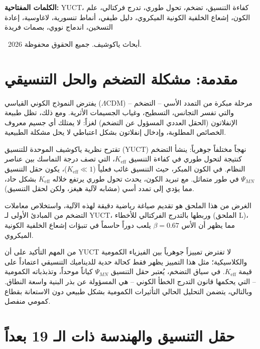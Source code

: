 \documentclass[11pt,a4paper]{article}
\theoremstyle{remark}
\newcommand{\Keff}{K_{\mathrm{eff}}}
\begin{document}
\begin{titlepage}
		\vspace{0.5cm}
		
		\noindent
		{\small\textbf{الكلمات المفتاحية:}} YUCT، كفاءة التنسيق، تضخم، تحول طوري، تدرج فركتالي، علم الكون، إشعاع الخلفية الكونية الميكروي، دليل طيفي، أنماط تنسورية، لاغاوسية، إعادة التسخين، اندماج نووي، بصمات فريدة
		
		\vspace{0.5cm}
		
		\noindent
		\textcopyright\ 2026 أبحاث ياكوشيف. جميع الحقوق محفوظة.
	\end{titlepage}
	
	\tableofcontents
	\newpage
	
	\section{مقدمة: مشكلة التضخم والحل التنسيقي}
	\label{sec:intro}
	
	يفترض النموذج الكوني القياسي ($\Lambda$CDM) مرحلة مبكرة من التمدد الأسي – التضخم – والتي تفسر التجانس، التسطيح، وغياب الجسيمات الأثرية. ومع ذلك، تظل طبيعة الإنفلاتون (الحقل العددي المسؤول عن التضخم) لغزاً: لا يمتلك أي جسيم معروف الخصائص المطلوبة، وإدخال إنفلاتون بشكل اعتباطي لا يحل مشكلة الطبيعية.
	
	تقترح نظرية ياكوشيف الموحدة للتنسيق (YUCT) نهجاً مختلفاً جوهرياً: ينشأ التضخم كنتيجة لتحول طوري في كفاءة التنسيق $\Keff$، التي تصف درجة التماسك بين عناصر النظام. في الكون المبكر، حيث التنسيق غائب فعلياً ($\Keff \ll 1$)، يكون حقل التنسيق $\Psi_{MN}$ في طور متماثل. مع تبريد الكون، يحدث تحول طوري يرتفع خلاله $\Keff$ بشكل حاد، مما يؤدي إلى تمدد أسي (مشابه لآلية هيغز، ولكن لحقل التنسيق).
	
	الغرض من هذا الملحق هو تقديم صياغة رياضية دقيقة لهذه الآلية، واستخلاص معاملات التضخم من المبادئ الأولى لـ YUCT، وربطها بالتدرج الفركتالي للأخطاء (الملحق L)، مما يظهر أن الأس $\beta = 0.67$ يلعب دوراً حاسماً في تنبؤات إشعاع الخلفية الكونية الميكروي.
	
	من المهم التأكيد على أن YUCT لا تفترض تمييزاً جوهرياً بين الفيزياء الكمومية والكلاسيكية؛ مثل هذا التمييز يظهر فقط كحالة حدية للديناميك التنسيقي اعتماداً على قيمة $K_{\mathrm{eff}}$. في سياق التضخم، يُعتبر حقل التنسيق $\Psi_{MN}$ كياناً موحداً، وتذبذباته الكمومية – التي يحكمها قانون التدرج الخطأ الكوني – هي المسؤولة عن بذر البنية واسعة النطاق. وبالتالي، يتضمن التحليل الحالي التأثيرات الكمومية بشكل طبيعي دون الاستعانة بقطاع كمومي منفصل.
	
	\section{حقل التنسيق والهندسة ذات الـ 19 بعداً}
	\label{sec:field}
	
\end{document}
